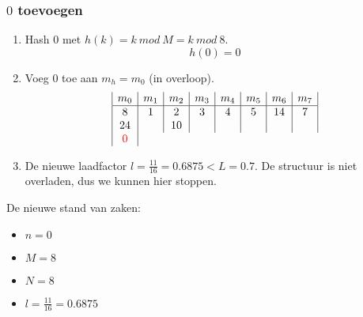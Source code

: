 \documentclass[hashing.tex]{subfiles}
\begin{document}
\subsubsection{$0$ toevoegen}
\begin{enumerate}
\item Hash $0$ met $h(k) = k\ mod\ M = k\ mod\ 8$.
\[
h(0) = 0
\]
\item Voeg $0$ toe aan $m_h = m_0$ (in overloop).
\[
\begin{array}{|c|c|c|c|c|c|c|c|}
m_0&m_1&m_2&m_3&m_4&m_5&m_6&m_7\\
\hline
8 & 1 & 2 & 3 & 4 & 5& 14&7\\
24&   & 10&  &   &&&\\
\color{red}0
\end{array} 
\]
\item De nieuwe laadfactor $l=\frac{11}{16} = 0.6875 < L = 0.7$. De structuur is niet overladen, dus we kunnen hier stoppen.
\end{enumerate}
De nieuwe stand van zaken:
\begin{multicols}{4}
\begin{itemize}
\item $n=0$
\item $M=8$
\item $N=8$
\item $l=\frac{11}{16} = 0.6875$
\end{itemize}
\end{multicols}
\end{document}
